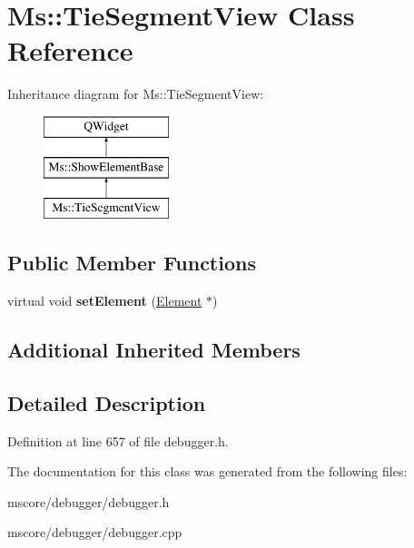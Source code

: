 \hypertarget{class_ms_1_1_tie_segment_view}{}\section{Ms\+:\+:Tie\+Segment\+View Class Reference}
\label{class_ms_1_1_tie_segment_view}
Inheritance diagram for Ms\+:\+:Tie\+Segment\+View\+:\begin{figure}[H]
\begin{center}
\leavevmode
\includegraphics[height=3.000000cm]{class_ms_1_1_tie_segment_view}
\end{center}
\end{figure}
\subsection*{Public Member Functions}
\begin{DoxyCompactItemize}
\item 
\mbox{\label{class_ms_1_1_tie_segment_view_ab07855a3e43508232e4d939ea9cdcb81}} 
virtual void {\bfseries set\+Element} (\hyperlink{class_ms_1_1_element}{Element} $\ast$)
\end{DoxyCompactItemize}
\subsection*{Additional Inherited Members}


\subsection{Detailed Description}


Definition at line 657 of file debugger.\+h.



The documentation for this class was generated from the following files\+:\begin{DoxyCompactItemize}
\item 
mscore/debugger/debugger.\+h\item 
mscore/debugger/debugger.\+cpp\end{DoxyCompactItemize}
